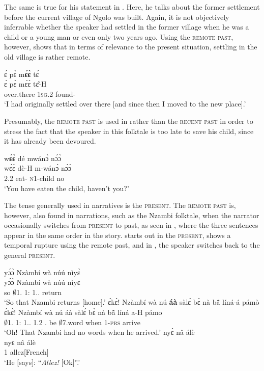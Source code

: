 The same is true for his statement in . Here, he talks about the former settlement before the current village of Ngolo was built. Again, it is not objectively inferrable whether the speaker had settled in the former village when he was a child or a young man or even only two years ago. Using the \textsc{remote past}, however, shows that in terms of relevance to the present situation, settling in the old village is rather remote.

\ea\label{PST2b}
  \glll   ɛ́ pɛ̀ m{\bfseries ɛ́ɛ̀} tɛ́ \\
          ɛ́ pɛ̀ mɛ́ɛ̀ tɛ̂-H \\
           {\LOC} over.there 1\textsc{sg}.{\PST}2 found-{\PST} \\
    \trans `I had originally settled over there [and since then I moved to the new place].'
\z

Presumably, the \textsc{remote past} is used in  rather than the \textsc{recent past} in order to stress the fact that the speaker in this folktale is too late to save his child, since it has already been devoured.

\ea\label{PST2125}
  \glll w{\bfseries ɛ́ɛ̀} dé mwánɔ̀ nɔ́ɔ̀ \\
       wɛ́ɛ̀ dè-H m-wánɔ̀ nɔ́ɔ̀ \\
      2.{\PST}2 eat-{\R} \textsc{n}1-child no\\
    \trans `You have eaten the child, haven't you?'
\z

The tense generally used in narratives is the \textsc{present}.
The \textsc{remote past} is, however, also found in narrations, such as the Nzambi folktale, when the narrator occasionally switches from \textsc{present} to past, as seen in , where the three sentences appear in the same order in the story.  starts out in the \textsc{present},  shows a temporal rupture using the remote past, and in , the speaker switches back to the general \textsc{present}.


\ea\label{pst2story}
\ea \label{pst2story1}
  \glll yɔ́ɔ̀ Nzàmbí wà núú nìyɛ̀ \\
        yɔ́ɔ̀ Nzàmbí wà núú nìyɛ \\
         so $\emptyset$1.{\PN} 1:{\ATT} 1.{\DEM}.{\DIST} return\\
    \trans `So that Nzambi returns [home].'
\ex\label{pst2story2}
  \glll ɛ́kɛ̀! Nzàmbí wà nú {\bfseries áà} sàlɛ́ bɛ̀ nà bã̂ líná-á pámò \\
      ɛ́kɛ̀! Nzàmbí wà nú áà sàlɛ́ bɛ̀ nà bã̂ líná a-H pámo\\
        {\EXCL} $\emptyset$1.{\PN} 1:{\ATT} 1.{\DEM}.{\DIST} 1.{\PST}2 {\NEG}.{\PST} be {\COM} $\emptyset$7.word when 1-\textsc{prs} arrive\\
    \trans `Oh! That Nzambi had no words when he arrived.'
\ex\label{pst2story3}
\glll nyɛ̀ nâ álè \\
       nyɛ nâ álè \\
       1 {\COMP} allez[French]  \\
    \trans `He [says]: ``{\itshape Allez!} [Ok]''.'
\z
\z

